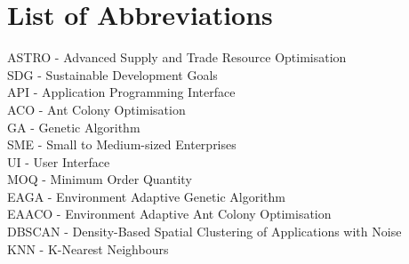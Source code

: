 \chapter*{List of Abbreviations}

ASTRO - Advanced Supply and Trade Resource Optimisation \\
SDG - Sustainable Development Goals \\
API - Application Programming Interface \\
ACO - Ant Colony Optimisation \\
GA - Genetic Algorithm \\
SME - Small to Medium-sized Enterprises \\
UI - User Interface \\
MOQ - Minimum Order Quantity \\
EAGA - Environment Adaptive Genetic Algorithm \\
EAACO - Environment Adaptive Ant Colony Optimisation \\
DBSCAN - Density-Based Spatial Clustering of Applications with Noise \\
KNN - K-Nearest Neighbours \\